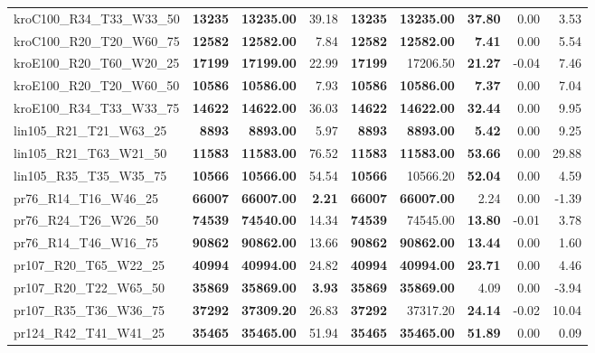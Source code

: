 \documentclass{singlecol-new}
\begin{document}
\begin{scriptsize}
\begin{longtable}{lrrrrrrrr}
		kroC100\_R34\_T33\_W33\_50 & \textbf{13235} & \textbf{13235.00} & 39.18 & \textbf{13235} & \textbf{13235.00} & \textbf{37.80} & 0.00 & 3.53 \\
		kroC100\_R20\_T20\_W60\_75 & \textbf{12582} & \textbf{12582.00} & 7.84 & \textbf{12582} & \textbf{12582.00} & \textbf{7.41} & 0.00 & 5.54 \\
		kroE100\_R20\_T60\_W20\_25 & \textbf{17199} & \textbf{17199.00} & 22.99 & \textbf{17199} & 17206.50 & \textbf{21.27} & -0.04 & 7.46 \\
		kroE100\_R20\_T20\_W60\_50 & \textbf{10586} & \textbf{10586.00} & 7.93 & \textbf{10586} & \textbf{10586.00} & \textbf{7.37} & 0.00 & 7.04 \\
		kroE100\_R34\_T33\_W33\_75 & \textbf{14622} & \textbf{14622.00} & 36.03 & \textbf{14622} & \textbf{14622.00} & \textbf{32.44} & 0.00 & 9.95 \\
		lin105\_R21\_T21\_W63\_25 & \textbf{8893} & \textbf{8893.00} & 5.97 & \textbf{8893} & \textbf{8893.00} & \textbf{5.42} & 0.00 & 9.25 \\
		lin105\_R21\_T63\_W21\_50 & \textbf{11583} & \textbf{11583.00} & 76.52 & \textbf{11583} & \textbf{11583.00} & \textbf{53.66} & 0.00 & 29.88 \\
		lin105\_R35\_T35\_W35\_75 & \textbf{10566} & \textbf{10566.00} & 54.54 & \textbf{10566} & 10566.20 & \textbf{52.04} & 0.00 & 4.59 \\
		pr76\_R14\_T16\_W46\_25 & \textbf{66007} & \textbf{66007.00} & \textbf{2.21} & \textbf{66007} & \textbf{66007.00} & 2.24 & 0.00 & -1.39 \\
		pr76\_R24\_T26\_W26\_50 & \textbf{74539} & \textbf{74540.00} & 14.34 & \textbf{74539} & 74545.00 & \textbf{13.80} & -0.01 & 3.78 \\
		pr76\_R14\_T46\_W16\_75 & \textbf{90862} & \textbf{90862.00} & 13.66 & \textbf{90862} & \textbf{90862.00} & \textbf{13.44} & 0.00 & 1.60 \\
		pr107\_R20\_T65\_W22\_25 & \textbf{40994} & \textbf{40994.00} & 24.82 & \textbf{40994} & \textbf{40994.00} & \textbf{23.71} & 0.00 & 4.46 \\
		pr107\_R20\_T22\_W65\_50 & \textbf{35869} & \textbf{35869.00} & \textbf{3.93} & \textbf{35869} & \textbf{35869.00} & 4.09 & 0.00 & -3.94 \\
		pr107\_R35\_T36\_W36\_75 & \textbf{37292} & \textbf{37309.20} & 26.83 & \textbf{37292} & 37317.20 & \textbf{24.14} & -0.02 & 10.04 \\
		pr124\_R42\_T41\_W41\_25 & \textbf{35465} & \textbf{35465.00} & 51.94 & \textbf{35465} & \textbf{35465.00} & \textbf{51.89} & 0.00 & 0.09 \\

\end{longtable}
\end{scriptsize}
\end{document}

